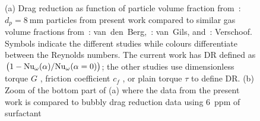 \begin{figure}
\centering%
%
%
\caption[]{(a) Drag reduction as function of particle volume fraction from
    \,: $d_p=\SI{8}{\milli\metre}$ particles from
    present work compared to similar gas volume fractions from
    \,: van~den~Berg\citep{vandenBerg2005},
    \,: van~Gils\citep{vanGils2013}, and
    \,: Verschoof\citep{Verschoof2016}. Symbols indicate the
    different studies while colours differentiate between the Reynolds
    numbers. The current work has DR defined as $\left(1 -
        \text{Nu}_\omega(\alpha) / \text{Nu}_\omega(\alpha=0) \right)$; the other
        studies use dimensionless torque $G$ \citep{vanGils2013}, friction
        coefficient $c_f$ \citep{vandenBerg2005}, or plain torque $\tau$
        \citep{Verschoof2016} to define DR. (b) Zoom of the bottom part of
    (a) where the data from the present work is compared to bubbly drag
reduction data using \SI{6}{ppm} of surfactant \citep{Verschoof2016}}
\label{fig:dragReductionAlpha}
\end{figure}

